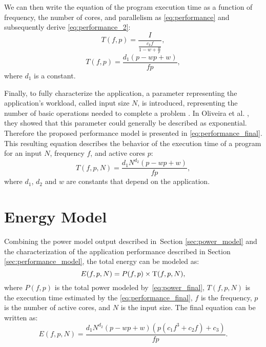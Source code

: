 We can then write the equation of the program execution time as a function of frequency, the number of cores, and parallelism  as \cref{eq:performance} and subsequently derive \cref{eq:performance_2}:
\begin{equation}
	T(f,p)=\frac{I}{ \frac{c_kf}{1-w+\frac{w}{p}} },
	\label{eq:performance}
\end{equation}
\begin{equation}
	T(f,p)=\frac{d_1(p-wp+w)}{fp},
	\label{eq:performance_2}
\end{equation}
where $d_1$ is a constant.

Finally, to fully characterize the application, a parameter representing the application's workload, called input size $N$, is introduced, representing the number of basic operations needed to complete a problem \cite{Kumar1994AnalyzingArchitectures}. In Oliveira et al. \cite{Oliveira2018ApplicationCharacterization}, they showed that this parameter could generally be described as exponential. Therefore the proposed performance model is presented in \cref{eq:performance_final}. This resulting equation describes the behavior of the execution time of a program for an input $N$, frequency $f$, and active cores $p$:
\begin{equation}
	T(f,p,N)=\frac{d_1N^{d_2}(p-wp+w)}{fp},
	\label{eq:performance_final}
\end{equation}
where $d_1$, $d_2$ and $w$ are constants that depend on the application.

\section{Energy Model} \label{sec:energy_model}
Combining the power model output described in~Section \ref{sec:power_model} and the characterization of the application performance described in Section \ref{sec:performance_model}, the total energy can be modeled as:
\begin{equation}
	E(f,p,N)=P(f,p)\times{\rm T}(f,p,N),
	\label{eq:en_combination}
\end{equation}
where $P(f,p)$ is the total power modeled by~\cref{eq:power_final}, ${T}(f,p,N)$ is the execution time estimated by the \cref{eq:performance_final}, $f$ is the frequency, $p$ is the number of active cores, and $N$ is the input size. The final equation can be written as:
\begin{equation}
	E(f,p,N)=\frac{d_1N^{d_2}(p-wp+w)(p(c_1f^3+c_2f)+c_3)}{fp}.
	\label{eq:en_final}
\end{equation}